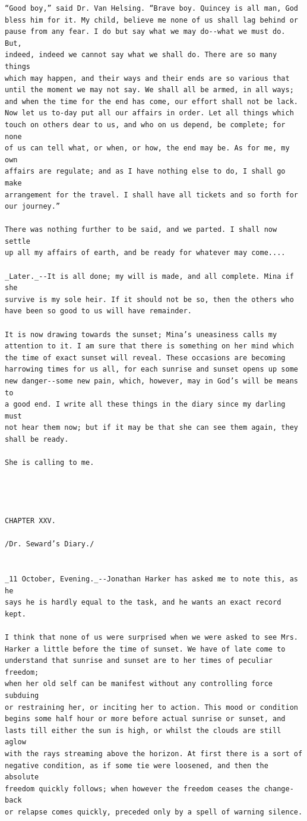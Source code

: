 \documentclass{article}
\begin{document}
\begin{verbatim}
“Good boy,” said Dr. Van Helsing. “Brave boy. Quincey is all man, God
bless him for it. My child, believe me none of us shall lag behind or
pause from any fear. I do but say what we may do--what we must do. But,
indeed, indeed we cannot say what we shall do. There are so many things
which may happen, and their ways and their ends are so various that
until the moment we may not say. We shall all be armed, in all ways;
and when the time for the end has come, our effort shall not be lack.
Now let us to-day put all our affairs in order. Let all things which
touch on others dear to us, and who on us depend, be complete; for none
of us can tell what, or when, or how, the end may be. As for me, my own
affairs are regulate; and as I have nothing else to do, I shall go make
arrangement for the travel. I shall have all tickets and so forth for
our journey.”

There was nothing further to be said, and we parted. I shall now settle
up all my affairs of earth, and be ready for whatever may come....

_Later._--It is all done; my will is made, and all complete. Mina if she
survive is my sole heir. If it should not be so, then the others who
have been so good to us will have remainder.

It is now drawing towards the sunset; Mina’s uneasiness calls my
attention to it. I am sure that there is something on her mind which
the time of exact sunset will reveal. These occasions are becoming
harrowing times for us all, for each sunrise and sunset opens up some
new danger--some new pain, which, however, may in God’s will be means to
a good end. I write all these things in the diary since my darling must
not hear them now; but if it may be that she can see them again, they
shall be ready.

She is calling to me.




CHAPTER XXV.

/Dr. Seward’s Diary./


_11 October, Evening._--Jonathan Harker has asked me to note this, as he
says he is hardly equal to the task, and he wants an exact record kept.

I think that none of us were surprised when we were asked to see Mrs.
Harker a little before the time of sunset. We have of late come to
understand that sunrise and sunset are to her times of peculiar freedom;
when her old self can be manifest without any controlling force subduing
or restraining her, or inciting her to action. This mood or condition
begins some half hour or more before actual sunrise or sunset, and
lasts till either the sun is high, or whilst the clouds are still aglow
with the rays streaming above the horizon. At first there is a sort of
negative condition, as if some tie were loosened, and then the absolute
freedom quickly follows; when however the freedom ceases the change-back
or relapse comes quickly, preceded only by a spell of warning silence.


\end{verbatim}
\end{document}
